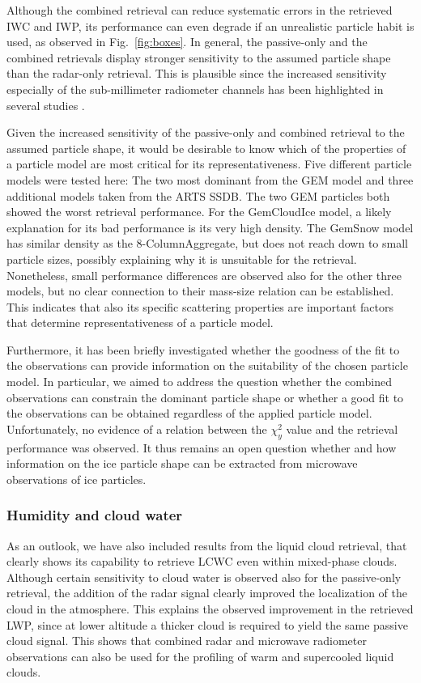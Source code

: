 \documentclass[journal abbreviation, manuscript]{copernicus}
\begin{document}
Although the combined retrieval can reduce systematic errors in the retrieved
IWC and IWP, its performance can even degrade if an unrealistic particle habit
is used, as observed in Fig.~\ref{fig:boxes}. In general, the passive-only and
the combined retrievals display stronger sensitivity to the assumed particle shape
than the radar-only retrieval. This is plausible since the increased sensitivity
especially of the sub-millimeter radiometer channels has been highlighted
in several studies \citep{ekelund19a, fox19}.

Given the increased sensitivity of the passive-only and combined retrieval to
the assumed particle shape, it would be desirable to know which of the
properties of a particle model are most critical for its representativeness. Five
different particle models were tested here: The two most dominant from
the GEM model and three additional models taken from the ARTS SSDB. The two GEM
particles both showed the worst retrieval performance. For the GemCloudIce model, a
likely explanation for its bad performance is its very high density. The GemSnow model
has similar density as the 8-ColumnAggregate, but does not reach down to small
particle sizes, possibly explaining why it is unsuitable for the retrieval.
Nonetheless, small performance differences are observed also for the other three
models, but no clear connection to their mass-size relation can be established.
This indicates that also its specific scattering properties are important factors
that determine representativeness of a particle model.

Furthermore, it has been briefly investigated whether the goodness of the fit to
the observations can provide information on the suitability of the chosen
particle model. In particular, we aimed to address the question whether the
combined observations can constrain the dominant particle shape or whether a
good fit to the observations can be obtained regardless of the applied particle
model. Unfortunately, no evidence of a relation between the $\chi^2_y$ value and
the retrieval performance was observed. It thus remains an open question whether
and how information on the ice particle shape can be extracted from microwave
observations of ice particles.

\subsubsection{Humidity and cloud water}

As an outlook, we have also included results from the liquid cloud retrieval,
that clearly shows its capability to retrieve LCWC even within mixed-phase
clouds. Although certain sensitivity to cloud water is observed also for the
passive-only retrieval, the addition of the radar signal clearly improved the
localization of the cloud in the atmosphere. This explains the observed
improvement in the retrieved LWP, since at lower altitude a thicker cloud is
required to yield the same passive cloud signal. This shows that combined radar
and microwave radiometer observations can also be used for the profiling of warm
and supercooled liquid clouds.
\end{document}
